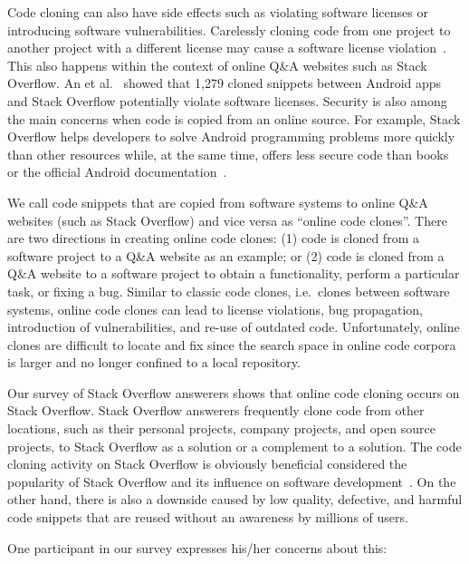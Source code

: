 \documentclass[10pt,journal,compsoc]{IEEEtran}
\begin{document}
Code cloning can also have side effects such as violating software
licenses or introducing software vulnerabilities. Carelessly cloning
code from one project to another project with a different license may
cause a software license violation~\cite{German2009}. This also
happens within the context of online Q\&A websites such as Stack
Overflow. An et al.~\cite{An2017} showed that 1,279 cloned snippets
between Android apps and Stack Overflow potentially violate software
licenses. Security is also among the main concerns when code is copied
from an online source. For example, Stack Overflow helps developers to solve
Android programming problems more quickly than other resources while,
at the same time, offers less secure code than books or the official
Android documentation~\cite{Acar2016}.

We call code snippets that are copied from software systems to online Q\&A
websites (such as Stack Overflow) and vice versa as ``online code clones''.
There are two directions in creating online code clones: (1) code is cloned from
a software project to a Q\&A website as an example; or (2) code is cloned from a
Q\&A website to a software project to obtain a functionality, perform a
particular task, or fixing a bug. %
Similar to classic code clones, i.e.~clones between software systems, online code clones
can lead to license violations, bug propagation, introduction of
vulnerabilities, and re-use of outdated code. Unfortunately, online clones are
difficult to locate and fix since the search space in online code corpora is
larger and no longer confined to a local repository.

Our survey of Stack Overflow answerers shows that online code cloning occurs on
Stack Overflow. Stack Overflow answerers frequently
clone code from other locations, such as their personal projects, company
projects, and open source projects, to Stack Overflow as a solution or
a complement to a solution. The code cloning activity on Stack Overflow
is obviously beneficial considered the popularity of Stack Overflow and its
influence on software development~\cite{Ponzanelli2013,Ponzanelli2014,Park2014}. On the other hand,
there is also a downside caused by low quality, defective, and harmful code
snippets that are reused without an awareness by millions of users.

One participant in our survey expresses his/her concerns about this:
\end{document}
